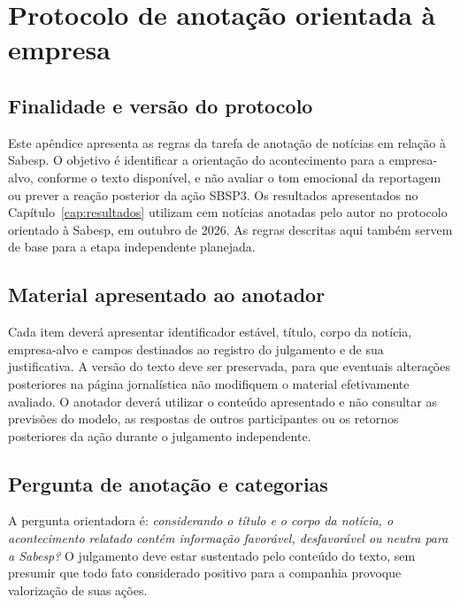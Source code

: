 \chapter{Protocolo de anotação orientada à empresa}
\label{ap:protocolo}

\section{Finalidade e versão do protocolo}

Este apêndice apresenta as regras da tarefa de anotação de notícias em relação à Sabesp. O objetivo é identificar a orientação do acontecimento para a empresa-alvo, conforme o texto disponível, e não avaliar o tom emocional da reportagem ou prever a reação posterior da ação SBSP3. Os resultados apresentados no Capítulo~\ref{cap:resultados} utilizam cem notícias anotadas pelo autor no protocolo orientado à Sabesp, em outubro de 2026. As regras descritas aqui também servem de base para a etapa independente planejada.

\section{Material apresentado ao anotador}

Cada item deverá apresentar identificador estável, título, corpo da notícia, empresa-alvo e campos destinados ao registro do julgamento e de sua justificativa. A versão do texto deve ser preservada, para que eventuais alterações posteriores na página jornalística não modifiquem o material efetivamente avaliado. O anotador deverá utilizar o conteúdo apresentado e não consultar as previsões do modelo, as respostas de outros participantes ou os retornos posteriores da ação durante o julgamento independente.

\section{Pergunta de anotação e categorias}

A pergunta orientadora é: \emph{considerando o título e o corpo da notícia, o acontecimento relatado contém informação favorável, desfavorável ou neutra para a Sabesp?} O julgamento deve estar sustentado pelo conteúdo do texto, sem presumir que todo fato considerado positivo para a companhia provoque valorização de suas ações.

